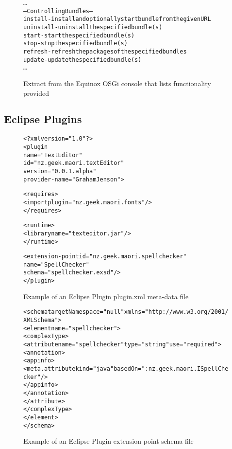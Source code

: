 \begin{figure}[htp]
\begin{center}
\begin{alltt}
\ldots
---Controlling Bundles---
    install - install and optionally start bundle from the given URL
    uninstall - uninstall the specified bundle(s)
    start - start the specified bundle(s)
    stop - stop the specified bundle(s)
    refresh - refresh the packages of the specified bundles
    update - update the specified bundle(s)
\ldots
\end{alltt}
  \caption[OSGi functionality extract]{Extract from the Equinox OSGi console that lists functionality provided}
  \label{osgibundle}
\end{center}
\end{figure}



\subsection{Eclipse Plugins}

\begin{figure}[htp]
\begin{center}
\begin{alltt}
<?xml version="1.0"?>
<plugin
    name="Text Editor"
    id="nz.geek.maori.textEditor"
    version="0.0.1.alpha"
    provider-name="Graham Jenson">
    
    <requires>
        <import plugin="nz.geek.maori.fonts"/>
    </requires>

    <runtime>
        <library name="texteditor.jar"/>
    </runtime>
    
    <extension-point id="nz.geek.maori.spellchecker" 
        name="Spell Checker" 
        schema="spellchecker.exsd"/>
</plugin>
\end{alltt}
  \caption[Eclipse Plugin meta-data]{Example of an Eclipse Plugin plugin.xml meta-data file}
  \label{osgibundle}
\end{center}
\end{figure}

\begin{figure}[htp]
\begin{center}
\begin{alltt}
<schema targetNamespace="null" xmlns="http://www.w3.org/2001/XMLSchema">
 <element name="spellchecker">
  <complexType>
   <attribute name="spellchecker" type="string" use="required">
    <annotation>
     <appinfo>
      <meta.attribute kind="java" basedOn=":nz.geek.maori.ISpellChecker"/>
     </appinfo>
    </annotation>
   </attribute>
  </complexType>
 </element>
</schema>
\end{alltt}
  \caption[Eclipse Plugin extension point schema]{Example of an Eclipse Plugin extension point schema file}
  \label{osgibundle}
\end{center}
\end{figure}

